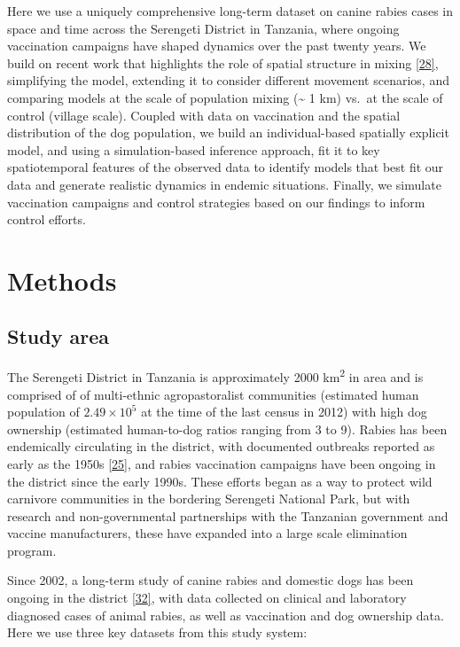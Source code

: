 \documentclass[
  oneside]{book}
\begin{document}
Here we use a uniquely comprehensive long-term dataset on canine rabies cases in space and time across the Serengeti District in Tanzania, where ongoing vaccination campaigns have shaped dynamics over the past twenty years. We build on recent work that highlights the role of spatial structure in mixing \protect\hyperlink{ref-Mancyinprep}{{[}28{]}}, simplifying the model, extending it to consider different movement scenarios, and comparing models at the scale of population mixing (\textasciitilde{} 1 km) vs.~at the scale of control (village scale). Coupled with data on vaccination and the spatial distribution of the dog population, we build an individual-based spatially explicit model, and using a simulation-based inference approach, fit it to key spatiotemporal features of the observed data to identify models that best fit our data and generate realistic dynamics in endemic situations. Finally, we simulate vaccination campaigns and control strategies based on our findings to inform control efforts.

\hypertarget{methods-2}{%
\section{Methods}\label{methods-2}}

\hypertarget{study-area}{%
\subsection{Study area}\label{study-area}}

The Serengeti District in Tanzania is approximately 2000 km\textsuperscript{2} in area and is comprised of of multi-ethnic agropastoralist communities (estimated human population of \ensuremath{2.49\times 10^{5}} at the time of the last census in 2012) with high dog ownership (estimated human-to-dog ratios ranging from 3 to 9). Rabies has been endemically circulating in the district, with documented outbreaks reported as early as the 1950s \protect\hyperlink{ref-brunker2015}{{[}25{]}}, and rabies vaccination campaigns have been ongoing in the district since the early 1990s. These efforts began as a way to protect wild carnivore communities in the bordering Serengeti National Park, but with research and non-governmental partnerships with the Tanzanian government and vaccine manufacturers, these have expanded into a large scale elimination program.

Since 2002, a long-term study of canine rabies and domestic dogs has been ongoing in the district \protect\hyperlink{ref-Hampson2009}{{[}32{]}}, with data collected on clinical and laboratory diagnosed cases of animal rabies, as well as vaccination and dog ownership data. Here we use three key datasets from this study system:
\end{document}
